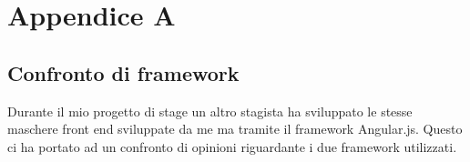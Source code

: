 
\chapter{Appendice A}

\section{Confronto di framework}

Durante il mio progetto di stage un altro stagista ha sviluppato le stesse maschere front end sviluppate da me ma tramite il framework Angular.js. Questo ci ha portato ad un confronto di opinioni riguardante i due framework utilizzati.





